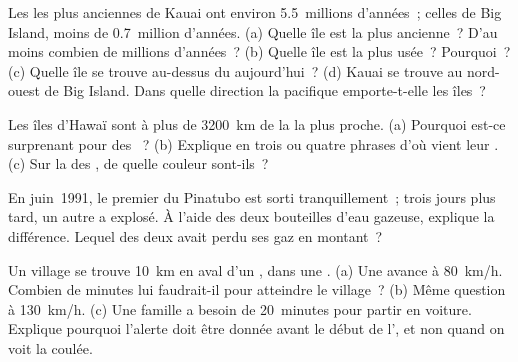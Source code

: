\begin{exercise}[$\star\star$]\label{exo:g7:volcanoes:8}
Les  les plus anciennes de Kauai ont environ 5.5~millions d'années~;
celles de Big Island, moins de 0.7~million d'années. (a) Quelle île est la
plus ancienne~? D'au moins combien de millions d'années~? (b) Quelle île
est la plus usée~? Pourquoi~? (c) Quelle île se trouve au-dessus du  aujourd'hui~? (d) Kauai se trouve au nord-ouest de Big Island. Dans
quelle direction la  pacifique emporte-t-elle les îles~?
\end{exercise}

\begin{exercise}[$\star\star$]\label{exo:g7:volcanoes:9}
Les îles d'Hawaï sont à plus de \qty{3200}{km} de la  la
plus proche. (a) Pourquoi est-ce surprenant pour des ~? (b) Explique
en trois ou quatre phrases d'où vient leur . (c) Sur la  des
, de quelle couleur sont-ils~?
\end{exercise}

\begin{exercise}[$\star\star$]\label{exo:g7:volcanoes:10}
En juin~1991, le premier  du Pinatubo est sorti tranquillement~; trois
jours plus tard, un autre  a explosé. À l'aide des deux bouteilles
d'eau gazeuse, explique la différence. Lequel des deux  avait perdu
ses gaz en montant~?
\end{exercise}

\begin{exercise}[$\star\star\star$]\label{exo:g7:volcanoes:11}
Un village se trouve \qty{10}{km} en aval d'un , dans une .
(a) Une  avance à \qty{80}{km/h}. Combien de minutes
lui faudrait-il pour atteindre le village~? (b) Même question à
\qty{130}{km/h}. (c) Une famille a besoin de 20~minutes pour partir en
voiture. Explique pourquoi l'alerte doit être donnée avant le début de
l', et non quand on voit la coulée.
\end{exercise}

